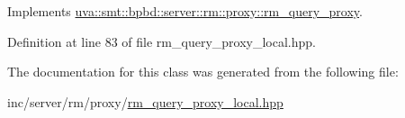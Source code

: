 Implements \hyperlink{classuva_1_1smt_1_1bpbd_1_1server_1_1rm_1_1proxy_1_1rm__query__proxy_a16a68e55c35c1cb1a76cb101d01b4558}{uva\+::smt\+::bpbd\+::server\+::rm\+::proxy\+::rm\+\_\+query\+\_\+proxy}.



Definition at line 83 of file rm\+\_\+query\+\_\+proxy\+\_\+local.\+hpp.



The documentation for this class was generated from the following file\+:\begin{DoxyCompactItemize}
\item 
inc/server/rm/proxy/\hyperlink{rm__query__proxy__local_8hpp}{rm\+\_\+query\+\_\+proxy\+\_\+local.\+hpp}\end{DoxyCompactItemize}
